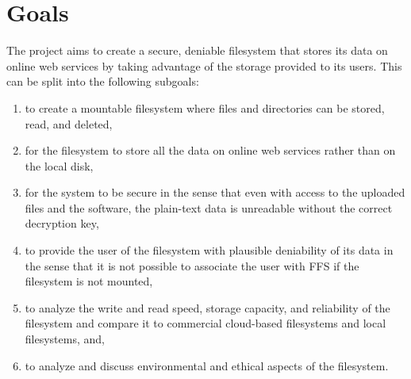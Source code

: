 
\section{Goals}


The project aims to create a secure, deniable filesystem that stores its data on online web services by taking advantage of the storage provided to its users. This can be split into the following subgoals:
\begin{enumerate}
\item to create a mountable filesystem where files and directories can be stored, read, and deleted,
\item for the filesystem to store all the data on online web services rather than on the local disk,
\item for the system to be secure in the sense that even with access to the uploaded files and the software, the \mbox{plain-text} data is unreadable without the correct decryption key, 
\item to provide the user of the filesystem with plausible deniability of its data in the sense that it is not possible to associate the user with \gls{FFS} if the filesystem is not mounted,
\item to analyze the write and read speed, storage capacity, and reliability of the filesystem and compare it to commercial \mbox{cloud-based} filesystems and local filesystems, and,
\item to analyze and discuss environmental and ethical aspects of the filesystem.
\end{enumerate}

